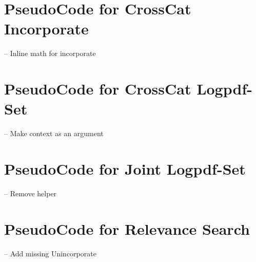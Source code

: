 \documentclass{article}
\begin{document}
\section{PseudoCode for CrossCat Incorporate} 
-- Inline math for incorporate
\section{PseudoCode for CrossCat Logpdf-Set}
-- Make context as an argument
\section{PseudoCode for Joint Logpdf-Set}
-- Remove helper
\section{PseudoCode for Relevance Search}
-- Add missing Unincorporate 
\end{document}
